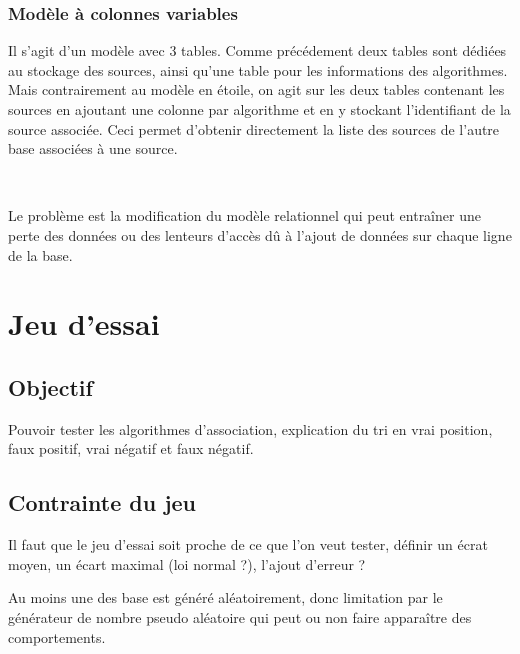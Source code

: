 		\subsubsection{Modèle à colonnes variables}
 
Il s'agit d'un modèle avec 3 tables. Comme précédement deux tables sont dédiées au stockage des sources, ainsi qu'une table pour les informations des algorithmes. Mais contrairement au modèle en étoile, on agit sur les deux tables contenant les sources en ajoutant une colonne par algorithme et en y stockant l'identifiant de la source associée. Ceci permet d'obtenir directement la liste des sources de l'autre base associées à une source.

\ 

Le problème est la modification du modèle relationnel qui peut entraîner une perte des données ou des lenteurs d'accès dû à l'ajout de données sur chaque ligne de la base.


\section{Jeu d'essai}

	\subsection{Objectif}

Pouvoir tester les algorithmes d'association, explication du tri en vrai position, faux positif, vrai négatif et faux négatif.

	\subsection{Contrainte du jeu}

Il faut que le jeu d'essai soit proche de ce que l'on veut tester, définir un écrat moyen, un écart maximal (loi normal ?), l'ajout d'erreur ?

Au moins une des base est généré aléatoirement, donc limitation par le générateur de nombre pseudo aléatoire qui peut ou non faire apparaître des comportements.


